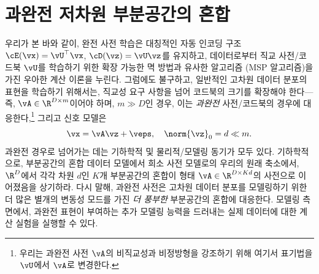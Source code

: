 \documentclass[../../book-main_ko.tex]{subfiles}
\begin{document}
\section{과완전 저차원 부분공간의 혼합}
\label{sec:dictionary_learning}
우리가 본 바와 같이, 완전 사전 학습은 대칭적인 자동 인코딩 구조 \(\cE(\vx) = \vU^\top \vx\), \(\cD(\vz) = \vU \vz\)를 유지하고, 데이터로부터 직교 사전/코드북 \(\vU\)를 학습하기 위한 확장 가능한 멱 방법과 유사한 알고리즘 (MSP 알고리즘)을 가진 우아한 계산 이론을 누린다. 그럼에도 불구하고, 일반적인 고차원 데이터 분포의 표현을 학습하기 위해서는, 직교성 요구 사항을 넘어 코드북의 크기를 확장해야 한다---즉, \(\vA \in \R^{D \times m}\)이어야 하며, \(m \gg D\)인 경우, 이는 \textit{과완전} 사전/코드북의 경우에 대응한다,\footnote{우리는 과완전 사전 \(\vA\)의 비직교성과 비정방형을 강조하기 위해 여기서 표기법을 \(\vU\)에서 \(\vA\)로 변경한다.} 그리고 신호 모델은
\begin{equation}\label{eq:model-DL-overcomplete}
    \vx =  \vA \vz + \veps,
    \quad
    \norm{\vz}_0 = d \ll m.
\end{equation}
과완전 경우로 넘어가는 데는 기하학적 및 물리적/모델링 동기가 모두 있다.
기하학적으로, 부분공간의 혼합 데이터 모델에서 희소 사전 모델로의 우리의 원래 축소에서, \(\R^D\)에서 각각 차원 \(d\)인 \(K\)개 부분공간의 혼합이 형태 \(\vA \in \R^{D \times Kd}\)의 사전으로 이어졌음을 상기하라.
다시 말해, 과완전 사전은 고차원 데이터 분포를 모델링하기 위한 더 많은 별개의 변동성 모드를 가진 \textit{더 풍부한} 부분공간의 혼합에 대응한다.
모델링 측면에서, 과완전 표현이 부여하는 추가 모델링 능력을 드러내는 실제 데이터에 대한 계산 실험을 실행할 수 있다.
\end{document}

